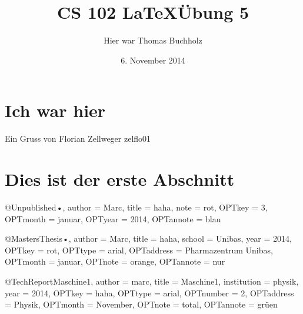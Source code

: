 \documentclass{article}
\author{Hier war Thomas Buchholz}
\title{CS 102 \LaTeX  \"Ubung 5}
\date{6. November 2014}
\begin{document}
\maketitle

\section{Ich war hier}
Ein Gruss von Florian Zellweger {zelflo01}

\section{Dies ist der erste Abschnitt}

@Unpublished{•,
author = {Marc},
title = {haha},
note = {rot},
OPTkey = {3},
OPTmonth = {januar},
OPTyear = {2014},
OPTannote = {blau}
}



@MastersThesis{•,
author = {Marc},
title = {haha},
school = {Unibas},
year = {2014},
OPTkey = {rot},
OPTtype = {arial},
OPTaddress = {Pharmazentrum Unibas},
OPTmonth = {januar},
OPTnote = {orange},
OPTannote = {nur}
}

@TechReport{Maschine1,
author = {marc},
title = {Maschine1},
institution = {physik},
year = {2014},
OPTkey = {haha},
OPTtype = {arial},
OPTnumber = {2},
OPTaddress = {Physik},
OPTmonth = {November},
OPTnote = {total},
OPTannote = {grüen}
}
\end{document}
